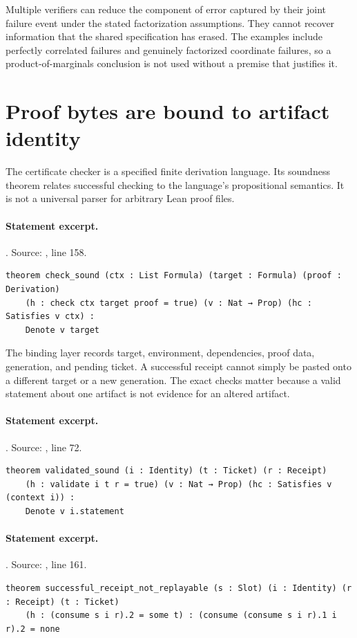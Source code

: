 \documentclass[11pt]{article}
\begin{document}
Multiple verifiers can reduce the component of error captured by their joint
failure event under the stated factorization assumptions. They cannot recover
information that the shared specification has erased. The examples include
perfectly correlated failures and genuinely factorized coordinate failures,
so a product-of-marginals conclusion is not used without a premise that
justifies it.

\section{Proof bytes are bound to artifact identity}
The certificate checker is a specified finite derivation language. Its
soundness theorem relates successful checking to the language's propositional
semantics. It is not a universal parser for arbitrary Lean proof files.

\paragraph{Statement excerpt.}. Source: , line 158.
\begin{lstlisting}[style=AVOCSource]
theorem check_sound (ctx : List Formula) (target : Formula) (proof : Derivation)
    (h : check ctx target proof = true) (v : Nat → Prop) (hc : Satisfies v ctx) :
    Denote v target
\end{lstlisting}


The binding layer records target, environment, dependencies, proof data,
generation, and pending ticket. A successful receipt cannot simply be pasted
onto a different target or a new generation. The exact checks matter because
a valid statement about one artifact is not evidence for an altered artifact.

\paragraph{Statement excerpt.}. Source: , line 72.
\begin{lstlisting}[style=AVOCSource]
theorem validated_sound (i : Identity) (t : Ticket) (r : Receipt)
    (h : validate i t r = true) (v : Nat → Prop) (hc : Satisfies v (context i)) :
    Denote v i.statement
\end{lstlisting}

\paragraph{Statement excerpt.}. Source: , line 161.
\begin{lstlisting}[style=AVOCSource]
theorem successful_receipt_not_replayable (s : Slot) (i : Identity) (r : Receipt) (t : Ticket)
    (h : (consume s i r).2 = some t) : (consume (consume s i r).1 i r).2 = none
\end{lstlisting}
\end{document}
